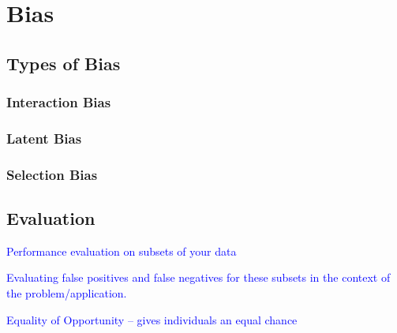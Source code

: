 \section{Bias}

\subsection{Types of Bias}

\subsubsection{Interaction Bias}

\subsubsection{Latent Bias}

\subsubsection{Selection Bias}


\subsection{Evaluation}

\textcolor{blue}{Performance evaluation on subsets of your data}

\textcolor{blue}{Evaluating false positives and false negatives for these subsets in the context of the problem/application.}

\textcolor{blue}{Equality of Opportunity -- gives individuals an equal chance}